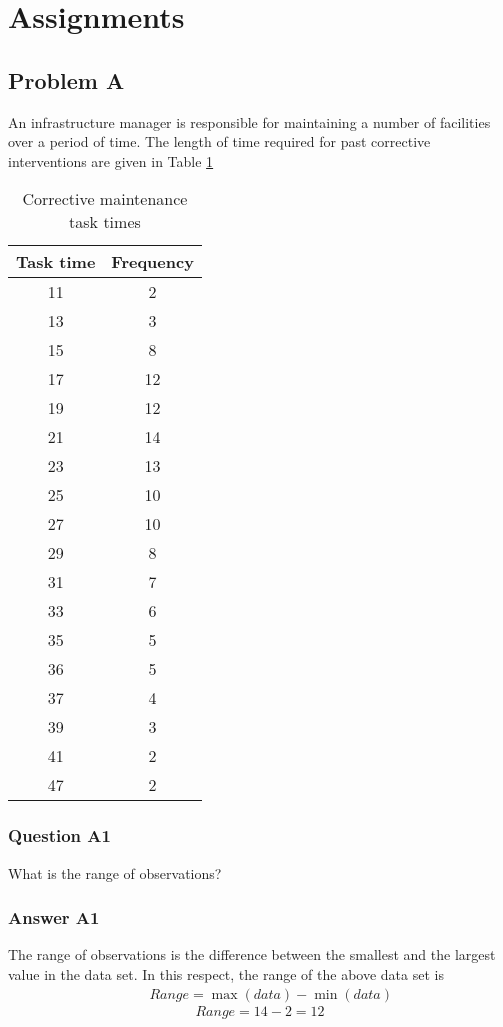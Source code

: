 \section{Assignments}
\subsection{Problem A}
An infrastructure manager is responsible for maintaining a number of
facilities over a period of time. The length of time required for past corrective
interventions are given in Table \ref{tblavaimain:8}

\begin{table}[h]
\caption{ Corrective maintenance task times}
\begin{tabular}{|c|c|}
\hline
Task time & Frequency \\ 
\hline
11 & 2 \\ 
\hline
13 & 3 \\ 
\hline
15 & 8 \\ 
\hline
17 & 12 \\ 
\hline
19 & 12 \\ 
\hline
21 & 14 \\ 
\hline
23 & 13 \\ 
\hline
25 & 10 \\ 
\hline
27 & 10 \\ 
\hline
29 & 8 \\ 
\hline
31 & 7 \\ 
\hline
33 & 6 \\ 
\hline
35 & 5 \\ 
\hline
36 & 5 \\ 
\hline
37 & 4 \\ 
\hline
39 & 3 \\ 
\hline
41 & 2 \\ 
\hline
47 & 2 \\ 
\hline
\end{tabular}
\label{tblavaimain:8}
\end{table}
\subsubsection{Question A1}
What is the range of observations?
\subsubsection{Answer A1}
The range of observations is the difference between the smallest and the
largest value in the data set. In this respect, the range of the above data set
is
\begin{eqnarray}
&& Range = \max (data) - \min (data)
\label{eqavaimain:1}
\end{eqnarray}
\[
Range = 14 - 2 = 12
\]
